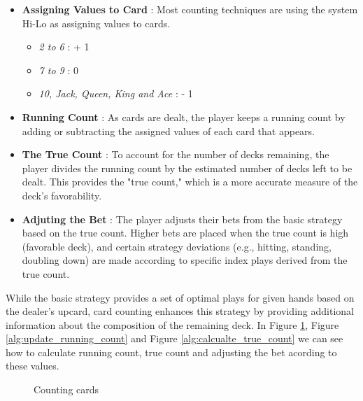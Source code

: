 \documentclass[a4paper,12pt]{report}
\begin{document}
\begin{itemize}
    \item \textbf{Assigning Values to Card} : Most counting techniques are using the system Hi-Lo as assigning values to cards.
    \begin{itemize}
        \item \textit{2 to 6} : + 1
        \item \textit{7 to 9} : 0
        \item \textit{10, Jack, Queen, King and Ace} : - 1
    \end{itemize}
    \item \textbf{Running Count} : As cards are dealt, the player keeps a running count by adding or subtracting the assigned values of each card that appears.
    \item \textbf{The True Count} : To account for the number of decks remaining, the player divides the running count by the estimated number of decks left to be dealt. This provides the "true count," which is a more accurate measure of the deck's favorability.
    \item \textbf{Adjuting the Bet} : The player adjusts their bets from the basic strategy based on the true count. Higher bets are placed when the true count is high (favorable deck), and certain strategy deviations (e.g., hitting, standing, doubling down) are made according to specific index plays derived from the true count.
\end{itemize}

While the basic strategy provides a set of optimal plays for given hands based on the dealer's upcard, card counting enhances this strategy by providing additional information about the composition of the remaining deck. In Figure \ref{alg:running_count}, Figure \ref{alg:update_running_count} and Figure \ref{alg:calcualte_true_count} we can see how to calculate running count, true count and adjusting the bet acording to these values.

\begin{figure}[H]
\caption{Counting cards}
\label{alg:running_count}
\end{figure}
\end{document}
